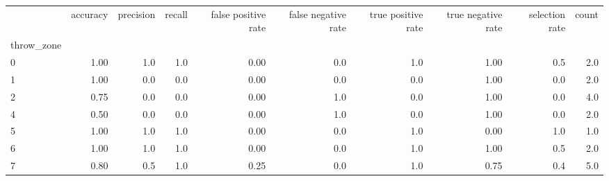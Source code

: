 \begin{tabular}{lrrrrrrrrr}
\toprule
{} &  accuracy &  precision &  recall &  false positive rate &  false negative rate &  true positive rate &  true negative rate &  selection rate &  count \\
throw\_zone &           &            &         &                      &                      &                     &                     &                 &        \\
\midrule
0          &      1.00 &        1.0 &     1.0 &                 0.00 &                  0.0 &                 1.0 &                1.00 &             0.5 &    2.0 \\
1          &      1.00 &        0.0 &     0.0 &                 0.00 &                  0.0 &                 0.0 &                1.00 &             0.0 &    2.0 \\
2          &      0.75 &        0.0 &     0.0 &                 0.00 &                  1.0 &                 0.0 &                1.00 &             0.0 &    4.0 \\
4          &      0.50 &        0.0 &     0.0 &                 0.00 &                  1.0 &                 0.0 &                1.00 &             0.0 &    2.0 \\
5          &      1.00 &        1.0 &     1.0 &                 0.00 &                  0.0 &                 1.0 &                0.00 &             1.0 &    1.0 \\
6          &      1.00 &        1.0 &     1.0 &                 0.00 &                  0.0 &                 1.0 &                1.00 &             0.5 &    2.0 \\
7          &      0.80 &        0.5 &     1.0 &                 0.25 &                  0.0 &                 1.0 &                0.75 &             0.4 &    5.0 \\
\bottomrule
\end{tabular}
